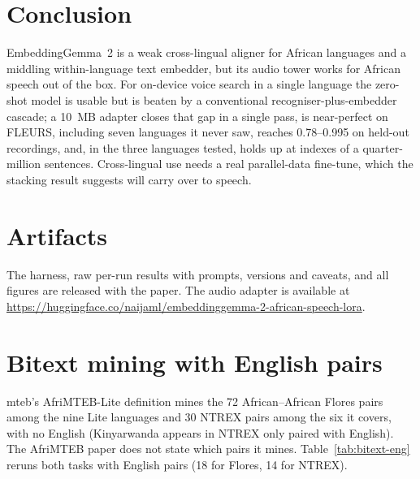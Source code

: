 \documentclass[11pt]{article}
\newcommand{\egtwo}{EmbeddingGemma~2}
\begin{document}
\section{Conclusion}

\egtwo{} is a weak cross-lingual aligner for African languages and a middling within-language text embedder, but its audio tower works for African speech out of the box. For on-device voice search in a single language the zero-shot model
is usable but is beaten by a conventional recogniser-plus-embedder cascade; a
10~MB adapter closes that gap in a single pass, is near-perfect on FLEURS, including seven languages it never saw, reaches 0.78--0.995 on held-out recordings, and, in the three languages tested, holds up at indexes of a quarter-million sentences. Cross-lingual use needs a real parallel-data fine-tune, which the stacking result suggests will carry over to speech.

\section*{Artifacts}

The harness, raw per-run results with prompts, versions and caveats, and all
figures are released with the paper. The audio adapter is available at
\url{https://huggingface.co/naijaml/embeddinggemma-2-african-speech-lora}.



\appendix

\section{Bitext mining with English pairs}
\label{app:bitext}

mteb's AfriMTEB-Lite definition mines the 72 African--African Flores pairs among the nine Lite languages and 30 NTREX pairs among the six it covers, with no English (Kinyarwanda appears in NTREX only paired with English). The AfriMTEB
paper does not state which pairs it mines. Table~\ref{tab:bitext-eng} reruns
both tasks with English pairs (18 for Flores, 14 for NTREX).
\end{document}
